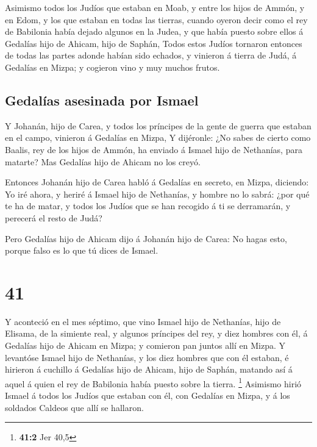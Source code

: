  Asimismo todos los Judíos que estaban en Moab, y entre los
hijos de Ammón, y en Edom, y los que estaban en todas las tierras,
cuando oyeron decir como el rey de Babilonia había dejado algunos en la
Judea, y que había puesto sobre ellos á Gedalías hijo de Ahicam, hijo de
Saphán,  Todos estos Judíos tornaron entonces de todas las
partes adonde habían sido echados, y vinieron á tierra de Judá, á
Gedalías en Mizpa; y cogieron vino y muy muchos frutos.

\hypertarget{gedaluxedas-asesinada-por-ismael}{%
\subsection{Gedalías asesinada por
Ismael}\label{gedaluxedas-asesinada-por-ismael}}

 Y Johanán, hijo de Carea, y todos los príncipes de la
gente de guerra que estaban en el campo, vinieron á Gedalías en Mizpa,
 Y dijéronle: ¿No sabes de cierto como Baalis, rey de los
hijos de Ammón, ha enviado á Ismael hijo de Nethanías, para matarte? Mas
Gedalías hijo de Ahicam no los creyó.

 Entonces Johanán hijo de Carea habló á Gedalías en
secreto, en Mizpa, diciendo: Yo iré ahora, y heriré á Ismael hijo de
Nethanías, y hombre no lo sabrá: ¿por qué te ha de matar, y todos los
Judíos que se han recogido á ti se derramarán, y perecerá el resto de
Judá?

 Pero Gedalías hijo de Ahicam dijo á Johanán hijo de Carea:
No hagas esto, porque falso es lo que tú dices de Ismael.

\hypertarget{section-40}{%
\section{41}\label{section-40}}

 Y aconteció en el mes séptimo, que vino Ismael hijo de
Nethanías, hijo de Elisama, de la simiente real, y algunos príncipes del
rey, y diez hombres con él, á Gedalías hijo de Ahicam en Mizpa; y
comieron pan juntos allí en Mizpa.  Y levantóse Ismael hijo
de Nethanías, y los diez hombres que con él estaban, é hirieron á
cuchillo á Gedalías hijo de Ahicam, hijo de Saphán, matando así á aquel
á quien el rey de Babilonia había puesto sobre la tierra. \footnote{\textbf{41:2}
  Jer 40,5}  Asimismo hirió Ismael á todos los Judíos que
estaban con él, con Gedalías en Mizpa, y á los soldados Caldeos que allí
se hallaron.

